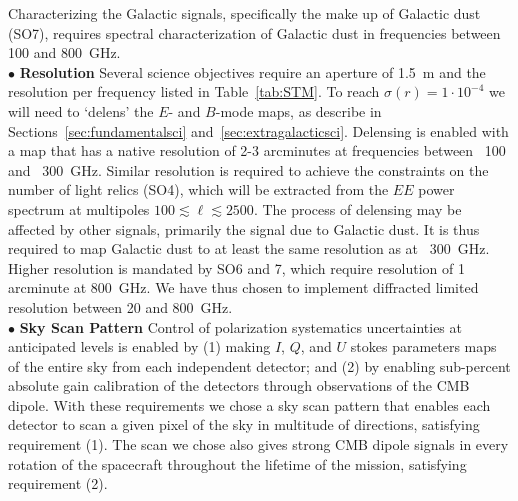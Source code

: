 \documentclass[PICOReport.tex]{subfiles}
\begin{document}
Characterizing the Galactic signals, specifically the make up of Galactic dust (SO7), requires spectral characterization 
of Galactic dust in frequencies between 100 and 800~GHz. \\ 
%
$\bullet$ {\bf Resolution} \hspace{0.1in} 
Several science objectives require an aperture of 1.5~m and the resolution per frequency listed in Table~\ref{tab:STM}. To reach $\sigma(r) = 1\cdot10^{-4}$ we will need to `delens' the $E$- and $B$-mode maps, as describe in Sections~\ref{sec:fundamentalsci} and~\ref{sec:extragalacticsci}. Delensing is enabled with a map that has a native resolution of 2-3 arcminutes at frequencies between ~100 and ~300~GHz. Similar resolution is required to achieve the constraints on the number of light relics (SO4), which will be extracted from the $EE$ power spectrum at multipoles $100 \lesssim \ell \lesssim 2500$.  The process of delensing may be affected by other signals, primarily the signal due to Galactic dust. It is thus required to map Galactic dust to at least the same resolution as at ~300~GHz. Higher resolution is mandated by SO6 and 7, which require resolution of 1 arcminute at 800~GHz.  We have thus chosen to implement diffracted limited resolution between 20 and 800~GHz. \\
%
$\bullet$ {\bf Sky Scan Pattern} \hspace{0.1in} 
Control of polarization systematics uncertainties at anticipated levels is enabled by (1) making $I$, $Q$, and $U$ stokes parameters maps of the entire sky from each independent detector; and (2) by enabling sub-percent absolute gain calibration of the detectors through observations of the CMB dipole.  With these requirements we chose a sky scan pattern that enables each detector to scan a given pixel of the sky in multitude of directions, satisfying requirement (1). The scan we chose also gives strong CMB dipole signals in every rotation of the spacecraft throughout the lifetime of the mission, satisfying requirement (2). 

 
\end{document}
